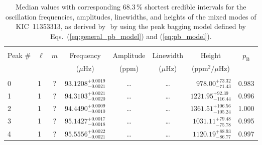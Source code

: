 \begin{table*}[!]
\caption{Median values with corresponding 68.3\,\% shortest credible intervals for the oscillation frequencies, amplitudes, linewidths, and heights of the mixed modes of KIC~11353313, as derived by \diamonds\,\,by using the peak bagging model defined by Eqs.~(\ref{eq:general_pb_model}) and (\ref{eq:pb_model}).}
\label{tab:11353313m}
\centering
\begin{tabular}{llcrrlrc}
\hline\hline
\\[-8pt]      
Peak \# & $\ell$ & $m$ & \multicolumn{1}{c}{Frequency} & \multicolumn{1}{c}{Amplitude} & \multicolumn{1}{c}{Linewidth} & \multicolumn{1}{c}{Height}& $p_\mathrm{B}$\\
 & & & \multicolumn{1}{c}{($\mu$Hz)} & \multicolumn{1}{c}{(ppm)} & \multicolumn{1}{c}{($\mu$Hz)} & \multicolumn{1}{c}{(ppm$^2/\mu$Hz)}\\
\hline \\[-8pt]
0 & 1 & ? & $     93.1208_{-      0.0021}^{+      0.0019}$ & \multicolumn{1}{c}{\dots} & \multicolumn{1}{c}{\dots} & $      978.00_{-       71.43}^{+       73.32}$ & 0.983\\[1pt]
1 & 1 & ? & $     94.3103_{-      0.0020}^{+      0.0021}$ & \multicolumn{1}{c}{\dots} & \multicolumn{1}{c}{\dots} & $     1221.95_{-      116.44}^{+       92.39}$ & 0.996\\[1pt]
2 & 1 & ? & $     94.4490_{-      0.0010}^{+      0.0009}$ & \multicolumn{1}{c}{\dots} & \multicolumn{1}{c}{\dots} & $     1361.51_{-      105.24}^{+      106.56}$ & 1.000\\[1pt]
3 & 1 & ? & $     95.1427_{-      0.0018}^{+      0.0017}$ & \multicolumn{1}{c}{\dots} & \multicolumn{1}{c}{\dots} & $     1031.11_{-       75.78}^{+       79.48}$ & 0.995\\[1pt]
4 & 1 & ? & $     95.5556_{-      0.0021}^{+      0.0022}$ & \multicolumn{1}{c}{\dots} & \multicolumn{1}{c}{\dots} & $     1120.19_{-       86.77}^{+       88.93}$ & 0.997\\[1pt]


\end{tabular}
\end{table*}
